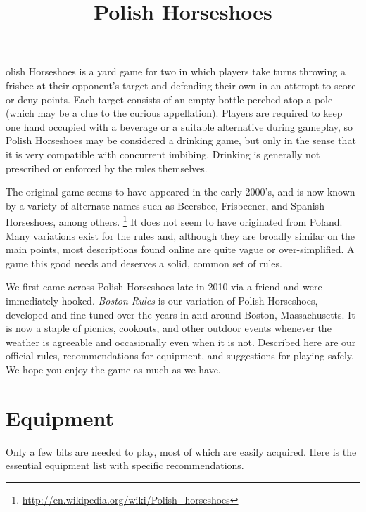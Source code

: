 \documentclass[11pt,letterpaper,twocolumn,english,DIV=calc]{scrartcl}
\title{\textsf{Polish Horseshoes}} %
\author{}
\date{}
\newcommand{\initial}[1]{ %
	\lettrine[lines=2, lhang=0.35, nindent=0.1em, loversize=0.25]{
		\color{DarkRed}{\textsf{#1}}}{}}
\begin{document}
\maketitle

\thispagestyle{headings}

\initial{P}olish Horseshoes is a yard game for two in which players take turns throwing a frisbee at their opponent's target and defending their own in an attempt to score or deny points.
Each target consists of an empty bottle perched atop a pole (which may be a clue to the curious appellation).
Players are required to keep one hand occupied with a beverage or a suitable alternative during gameplay, so Polish Horseshoes may be considered a drinking game, but only in the sense that it is very compatible with concurrent imbibing.
Drinking is generally not prescribed or enforced by the rules themselves.

The original game seems to have appeared in the early 2000's, and is now known by a variety of alternate names such as Beersbee, Frisbeener, and Spanish Horseshoes, among others.%
\footnote{\url{http://en.wikipedia.org/wiki/Polish_horseshoes}}
It does not seem to have originated from Poland.
Many variations exist for the rules and, although they are broadly similar on the main points, most descriptions found online are quite vague or over-simplified. 
A game this good needs and deserves a solid, common set of rules.

We first came across Polish Horseshoes late in 2010 via a friend and were immediately hooked. 
\emph{Boston Rules} is our variation of Polish Horseshoes, developed and fine-tuned over the years in and around Boston, Massachusetts. 
It is now a staple of picnics, cookouts, and other outdoor events whenever the weather is agreeable and occasionally even when it is not. 
Described here are our official rules, recommendations for equipment, and suggestions for playing safely. 
We hope you enjoy the game as much as we have.


\part*{Equipment}

Only a few bits are needed to play, most of which are easily acquired.
Here is the essential equipment list with specific recommendations. 
\end{document}
